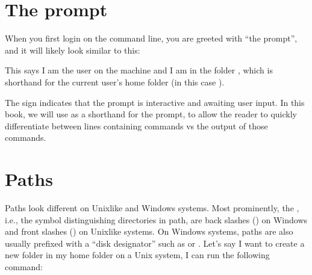 \ignorespaces 

\section{The prompt}
\label{\detokenize{intro/howto:the-prompt}}\label{\detokenize{intro/howto:index-4}}
\sphinxAtStartPar
When you first login on the command line, you are greeted with “the prompt”,
and it will likely look similar to this:

\sphinxAtStartPar
{}

\sphinxAtStartPar
This says I am the user  on the machine  and I am in the folder \sphinxcode{\sphinxupquote{\textasciitilde{}}},
which is shorthand for the current user’s home folder (in this case ).

\sphinxAtStartPar
The \sphinxcode{\sphinxupquote{\$}} sign indicates that the prompt is interactive and awaiting user input.
In this book, we will use \sphinxcode{\sphinxupquote{\$}} as a shorthand for the prompt, to allow
the reader to quickly differentiate between lines containing commands vs the
output of those commands.

\ignorespaces 

\section{Paths}
\label{\detokenize{intro/howto:paths}}\label{\detokenize{intro/howto:index-5}}
\sphinxAtStartPar
Paths look different on Unix\sphinxhyphen{}like and Windows systems.
Most prominently, the , i.e., the symbol distinguishing directories in path, are back slashes (\sphinxcode{\sphinxupquote{\textbackslash{}}}) on Windows and front slashes (\sphinxcode{\sphinxupquote{/}}) on Unix\sphinxhyphen{}like systems.
On Windows systems, paths are also usually prefixed with a “disk designator” such as  or .
Let’s say I want to create a new folder in my home folder on a Unix system,
I can run the following command:

